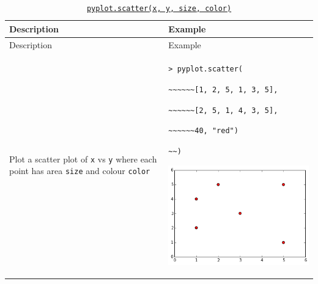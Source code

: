 \documentclass[10pt,a4paperpaper,]{article}
\begin{document}
\begin{longtable}[]{@{}ll@{}}
\caption{\href{http://matplotlib.org/api/pyplot_api.html\#matplotlib.pyplot.scatter}{\texttt{pyplot.scatter(x,\ y,\ size,\ color)}}}\tabularnewline
\toprule
\begin{minipage}[b]{0.47\columnwidth}\raggedright\strut
Description
\strut\end{minipage} &
\begin{minipage}[b]{0.47\columnwidth}\raggedright\strut
Example
\strut\end{minipage}\tabularnewline
\midrule
\endfirsthead
\toprule
\begin{minipage}[b]{0.47\columnwidth}\raggedright\strut
Description
\strut\end{minipage} &
\begin{minipage}[b]{0.47\columnwidth}\raggedright\strut
Example
\strut\end{minipage}\tabularnewline
\midrule
\endhead
\begin{minipage}[t]{0.47\columnwidth}\raggedright\strut
Plot a scatter plot of \texttt{x} vs \texttt{y} where each point has
area \texttt{size} and colour \texttt{color}
\strut\end{minipage} &
\begin{minipage}[t]{0.47\columnwidth}\raggedright\strut
\texttt{\textgreater{}\ pyplot.scatter(}

\texttt{\textasciitilde{}\textasciitilde{}\textasciitilde{}\textasciitilde{}\textasciitilde{}\textasciitilde{}{[}1,\ 2,\ 5,\ 1,\ 3,\ 5{]},}

\texttt{\textasciitilde{}\textasciitilde{}\textasciitilde{}\textasciitilde{}\textasciitilde{}\textasciitilde{}{[}2,\ 5,\ 1,\ 4,\ 3,\ 5{]},}

\texttt{\textasciitilde{}\textasciitilde{}\textasciitilde{}\textasciitilde{}\textasciitilde{}\textasciitilde{}40,\ "red")}

\texttt{\textasciitilde{}\textasciitilde{})}

\includegraphics[width=\textwidth]{assets/03-scatter.png}
\strut\end{minipage}\tabularnewline
\bottomrule
\end{longtable}
\end{document}
